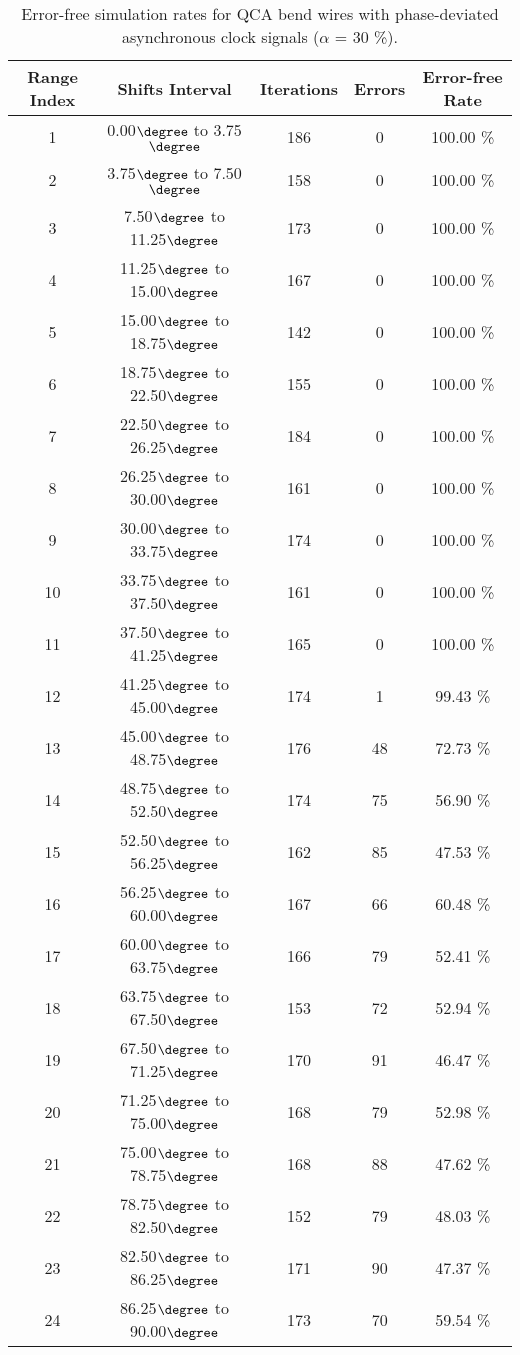 \flushleft
\begin{table}[h]
\begin{center}
\caption{Error-free simulation rates for QCA bend wires with phase-deviated asynchronous clock signals ($\alpha$ = 30 \%).}
\begin{tabular}{|c|c|c|c|c|}
\hline
\textbf{Range Index} & \textbf{Shifts Interval} & \textbf{Iterations} & \textbf{Errors} & \textbf{Error-free Rate} \\
\hline
1  &  0.00$\degree$ to  3.75$\degree$ & 186 &  0 & 100.00 \% \\
\hline
2  &  3.75$\degree$ to  7.50$\degree$ & 158 &  0 & 100.00 \% \\
\hline
3  &  7.50$\degree$ to 11.25$\degree$ & 173 &  0 & 100.00 \% \\
\hline
4  & 11.25$\degree$ to 15.00$\degree$ & 167 &  0 & 100.00 \% \\
\hline
5  & 15.00$\degree$ to 18.75$\degree$ & 142 &  0 & 100.00 \% \\
\hline
6  & 18.75$\degree$ to 22.50$\degree$ & 155 &  0 & 100.00 \% \\
\hline
7  & 22.50$\degree$ to 26.25$\degree$ & 184 &  0 & 100.00 \% \\
\hline
8  & 26.25$\degree$ to 30.00$\degree$ & 161 &  0 & 100.00 \% \\
\hline
9  & 30.00$\degree$ to 33.75$\degree$ & 174 &  0 & 100.00 \% \\
\hline
10 & 33.75$\degree$ to 37.50$\degree$ & 161 &  0 & 100.00 \% \\
\hline
11 & 37.50$\degree$ to 41.25$\degree$ & 165 &  0 & 100.00 \% \\
\hline
12 & 41.25$\degree$ to 45.00$\degree$ & 174 &  1 &  99.43 \% \\
\hline
13 & 45.00$\degree$ to 48.75$\degree$ & 176 & 48 &  72.73 \% \\
\hline
14 & 48.75$\degree$ to 52.50$\degree$ & 174 & 75 &  56.90 \% \\
\hline
15 & 52.50$\degree$ to 56.25$\degree$ & 162 & 85 &  47.53 \% \\
\hline
16 & 56.25$\degree$ to 60.00$\degree$ & 167 & 66 &  60.48 \% \\
\hline
17 & 60.00$\degree$ to 63.75$\degree$ & 166 & 79 &  52.41 \% \\
\hline
18 & 63.75$\degree$ to 67.50$\degree$ & 153 & 72 &  52.94 \% \\
\hline
19 & 67.50$\degree$ to 71.25$\degree$ & 170 & 91 &  46.47 \% \\
\hline
20 & 71.25$\degree$ to 75.00$\degree$ & 168 & 79 &  52.98 \% \\
\hline
21 & 75.00$\degree$ to 78.75$\degree$ & 168 & 88 &  47.62 \% \\
\hline
22 & 78.75$\degree$ to 82.50$\degree$ & 152 & 79 &  48.03 \% \\
\hline
23 & 82.50$\degree$ to 86.25$\degree$ & 171 & 90 &  47.37 \% \\
\hline
24 & 86.25$\degree$ to 90.00$\degree$ & 173 & 70 &  59.54 \% \\
\hline


\end{tabular}
\end{center}
\end{table}
